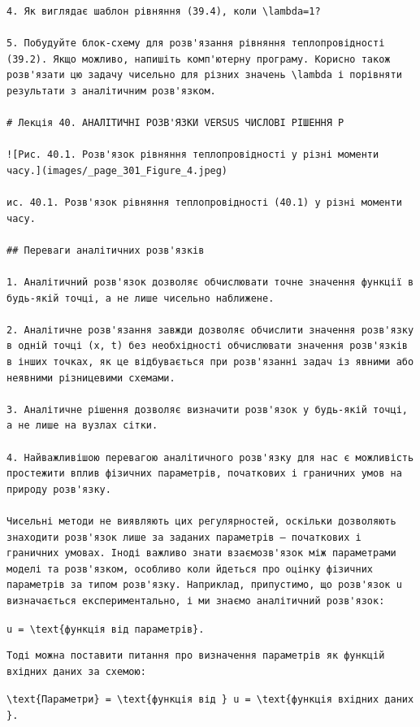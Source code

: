 \documentclass[
  ukrainian,
]{article}
\begin{document}
\begin{verbatim}
4. Як виглядає шаблон рівняння (39.4), коли \lambda=1?

5. Побудуйте блок-схему для розв'язання рівняння теплопровідності (39.2). Якщо можливо, напишіть комп'ютерну програму. Корисно також розв'язати цю задачу чисельно для різних значень \lambda і порівняти результати з аналітичним розв'язком.

# Лекція 40. АНАЛІТИЧНІ РОЗВ'ЯЗКИ VERSUS ЧИСЛОВІ РІШЕННЯ Р

![Рис. 40.1. Розв'язок рівняння теплопровідності у різні моменти часу.](images/_page_301_Figure_4.jpeg)

ис. 40.1. Розв'язок рівняння теплопровідності (40.1) у різні моменти часу.

## Переваги аналітичних розв'язків

1. Аналітичний розв'язок дозволяє обчислювати точне значення функції в будь-якій точці, а не лише чисельно наближене.

2. Аналітичне розв'язання завжди дозволяє обчислити значення розв'язку в одній точці (x, t) без необхідності обчислювати значення розв'язків в інших точках, як це відбувається при розв'язанні задач із явними або неявними різницевими схемами.

3. Аналітичне рішення дозволяє визначити розв'язок у будь-якій точці, а не лише на вузлах сітки.

4. Найважливішою перевагою аналітичного розв'язку для нас є можливість простежити вплив фізичних параметрів, початкових і граничних умов на природу розв'язку.

Чисельні методи не виявляють цих регулярностей, оскільки дозволяють знаходити розв'язок лише за заданих параметрів — початкових і граничних умовах. Іноді важливо знати взаємозв'язок між параметрами моделі та розв'язком, особливо коли йдеться про оцінку фізичних параметрів за типом розв'язку. Наприклад, припустимо, що розв'язок u визначається експериментально, і ми знаємо аналітичний розв'язок:
\end{verbatim}

\texttt{u\ =\ \textbackslash{}text\{функція\ від\ параметрів\}.}

\begin{verbatim}
Тоді можна поставити питання про визначення параметрів як функцій вхідних даних за схемою:
\end{verbatim}

\texttt{\textbackslash{}text\{Параметри\}\ =\ \textbackslash{}text\{функція\ від\ \}\ u\ =\ \textbackslash{}text\{функція\ вхідних\ даних\}.}
\end{document}
